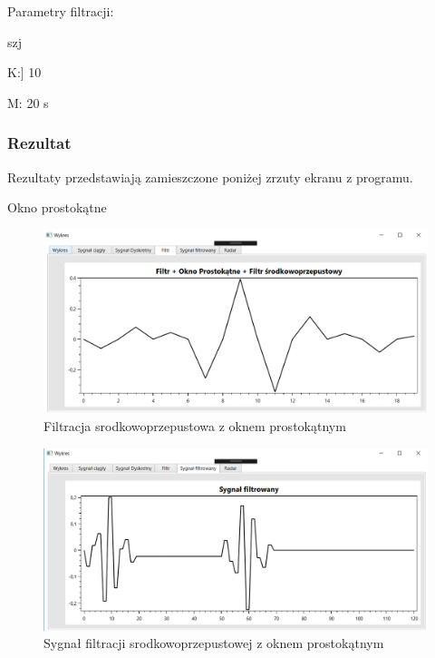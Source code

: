 \documentclass[12pt]{article}
\begin{document}
Parametry filtracji:

\begin{labeling}{szj}
\item K:] 10
\item [M:] 20 s
\end{labeling}

\subsubsection{Rezultat}

Rezultaty przedstawiają zamieszczone poniżej zrzuty ekranu z programu. 

Okno prostokątne
\begin{figure}[h!]
 \centering
 \includegraphics[width=12.3cm]{prostFSOP.PNG}
 \vspace{-0.3cm}
 \caption{Filtracja srodkowoprzepustowa z oknem prostokątnym}
 \label{Wykres dla wyników eksperymentu drugiego}
\end{figure}

\begin{figure}[h!]
 \centering
 \includegraphics[width=12.3cm]{prostSFSP.PNG}
 \vspace{-0.3cm}
 \caption{Sygnał filtracji srodkowoprzepustowej z oknem prostokątnym}
 \label{sfsp}
\end{figure}
\end{document}

